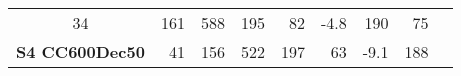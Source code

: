 \begin{longtable}[]{@{}crrrrrrrr@{}}
\begin{minipage}[t]{0.09\columnwidth}
34\strut
\end{minipage} & \begin{minipage}[t]{0.06\columnwidth}\raggedleft\strut
161\strut
\end{minipage} & \begin{minipage}[t]{0.06\columnwidth}\raggedleft\strut
588\strut
\end{minipage} & \begin{minipage}[t]{0.07\columnwidth}\raggedleft\strut
195\strut
\end{minipage} & \begin{minipage}[t]{0.07\columnwidth}\raggedleft\strut
82\strut
\end{minipage} & \begin{minipage}[t]{0.04\columnwidth}\raggedleft\strut
-4.8\strut
\end{minipage} & \begin{minipage}[t]{0.13\columnwidth}\raggedleft\strut
190\strut
\end{minipage} & \begin{minipage}[t]{0.13\columnwidth}\raggedleft\strut
75\strut
\end{minipage}\tabularnewline
\begin{minipage}[t]{0.10\columnwidth}\centering\strut
\textbf{S4 CC600Dec50}\strut
\end{minipage} & \begin{minipage}[t]{0.09\columnwidth}\raggedleft\strut
41\strut
\end{minipage} & \begin{minipage}[t]{0.06\columnwidth}\raggedleft\strut
156\strut
\end{minipage} & \begin{minipage}[t]{0.06\columnwidth}\raggedleft\strut
522\strut
\end{minipage} & \begin{minipage}[t]{0.07\columnwidth}\raggedleft\strut
197\strut
\end{minipage} & \begin{minipage}[t]{0.07\columnwidth}\raggedleft\strut
63\strut
\end{minipage} & \begin{minipage}[t]{0.04\columnwidth}\raggedleft\strut
-9.1\strut
\end{minipage} & \begin{minipage}[t]{0.13\columnwidth}\raggedleft\strut
188\strut
\end{minipage} & \begin{minipage}[t]{0.13\columnwidth}\raggedleft\strut

\end{minipage}
\end{longtable}
